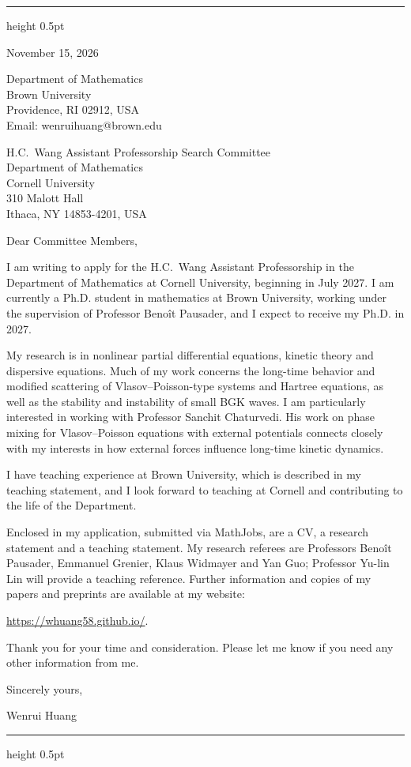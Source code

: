 \documentclass[10pt]{article}
\begin{document}
\vspace{0.08in}
\hrule height 0.5pt

\vspace{0.47in}
\hfill
\begin{minipage}{2.27in}
November 15, 2026

\vspace{0.16in}
Department of Mathematics\\
Brown University\\
Providence, RI 02912, USA\\
Email: wenrui\textunderscore huang@brown.edu
\end{minipage}

\vspace{0.30in}
H.C.\ Wang Assistant Professorship Search Committee\\
Department of Mathematics\\
Cornell University\\
310 Malott Hall\\
Ithaca, NY 14853-4201, USA

\vspace{0.16in}
Dear Committee Members,

I am writing to apply for the H.C.\ Wang Assistant Professorship in the Department of Mathematics at Cornell University, beginning in July 2027. I am currently a Ph.D. student in mathematics at Brown University, working under the supervision of Professor Beno\^{i}t Pausader, and I expect to receive my Ph.D. in 2027.

My research is in nonlinear partial differential equations, kinetic theory and dispersive equations. Much of my work concerns the long-time behavior and modified scattering of Vlasov--Poisson-type systems and Hartree equations, as well as the stability and instability of small BGK waves. I am particularly interested in working with Professor Sanchit Chaturvedi. His work on phase mixing for Vlasov--Poisson equations with external potentials connects closely with my interests in how external forces influence long-time kinetic dynamics.

I have teaching experience at Brown University, which is described in my teaching statement, and I look forward to teaching at Cornell and contributing to the life of the Department.

Enclosed in my application, submitted via MathJobs, are a CV, a research statement and a teaching statement. My research referees are Professors Beno\^{i}t Pausader, Emmanuel Grenier, Klaus Widmayer and Yan Guo; Professor Yu-lin Lin will provide a teaching reference. Further information and copies of my papers and preprints are available at my website:

\url{https://whuang58.github.io/}.

\medskip
Thank you for your time and consideration. Please let me know if you need any other information from me.

\vspace{0.12in}
Sincerely yours,

\vspace{0.12in}
Wenrui Huang

\vfill
\hrule height 0.5pt
\end{document}
